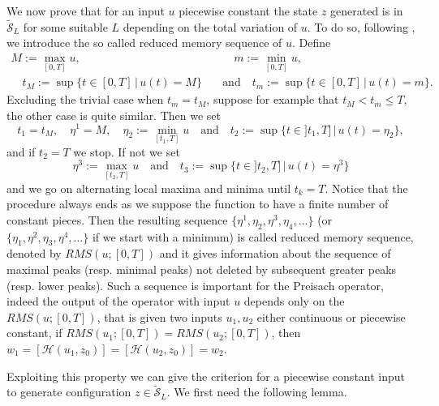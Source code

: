 \documentclass[12pt]{article}
\newcommand{\HM}{\mathcal{H}}
\newcommand{\1}{\mathds{1}}
\theoremstyle{definition}
\begin{document}
We now prove that for an input $u$ piecewise constant the state $z$ generated is in $\tilde{\mathcal S}_L$ for some suitable $L$ depending on the total variation of $u$. To do so, following \cite[Section~III.6]{AVH}, we introduce the so called reduced memory sequence of $u$. Define \[\begin{split}   
M:= \max_{[0,T]} u, &\quad m := \min_{[0,T]} u, \\ \quad t_M:= \sup \{ t\in [0,T]\,|\, u(t)=M\} \quad & \text{and} \quad t_m:= \sup \{ t\in [0,T]\,|\, u(t)=m\}.\end{split}\] Excluding the trivial case when $t_m=t_M$, suppose for example that $t_M < t_m\leq T$, the other case is quite similar. Then we set  \[ t_1=t_M,\quad \eta^1=M, \quad \eta_2:=\min_{[t_1,T]} u  \quad \text{and} \quad t_2:= \sup\{ t\in ]t_1,T]\,|\, u(t) = \eta_2\},  \] and if $t_2= T$ we stop. If not we set \[\eta^3:=\max_{[t_2,T]} u  \quad \text{and} \quad t_3:= \sup\{ t\in ]t_2,T]\,|\, u(t) = \eta^3\}\] and we go on alternating local maxima and minima until $t_k=T$. Notice that the procedure always ends as we suppose the function to have a finite number of constant pieces. Then the resulting sequence $\{\eta^1,\eta_2,\eta^3,\eta_4,\dots\}$ (or $\{\eta_1,\eta^2,\eta_3,\eta^4,\dots\}$ if we start with a minimum) is called reduced memory sequence, denoted by $RMS(u; [0,T])$ and it gives information about the sequence of maximal peaks (resp. minimal peaks) not deleted by subsequent greater peaks (resp. lower peaks). Such a sequence is important for the Preisach operator, indeed the output of the operator with input $u$ depends only on the $RMS(u; [0,T])$, that is given two inputs $u_1,u_2$ either continuous or piecewise constant, if $RMS(u_1; [0,T])=RMS(u_2; [0,T])$, then $w_1=[\HM(u_1,z_0)]=[\HM(u_2,z_0)]=w_2$.\par Exploiting this property we can give the criterion for a piecewise constant input to generate configuration $z \in \tilde{\mathcal S}_L.$ We first need the following lemma.
\end{document}
